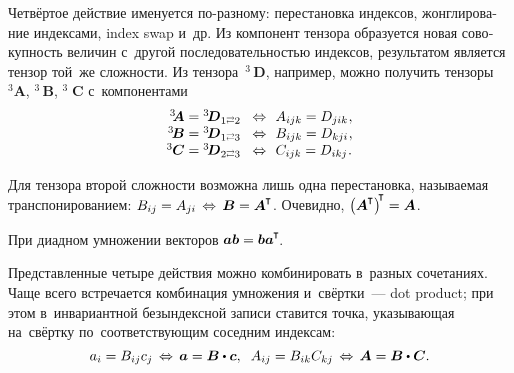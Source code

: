 \begin{otherlanguage}{russian}
Четвёртое действие именуется по\hbox{-}разному: перестановка индексов, жонглирование индексами, index swap и~др. Из компонент тензора образуется новая совокупность величин с~другой последовательностью индексов, результатом является тензор той~же сложности. Из тензора~${^3\!\!\,\bm{D}}$, например, можно получить тензоры ${^3\!\!\bm{A}}$, ${^3\!\!\,\bm{B}}$, ${^3\!\!\;\bm{C}}$ с~компонентами
\vspace{0.08em}\begin{equation}\label{action:4}
\begin{array}{rcl}
{^3\hspace{-0.25em}\bm{A}} = {^3\hspace{-0.16em}\bm{D}}_{1 \scalebox{0.6}[0.8]{$\rightleftarrows$} 2} & \!\Leftrightarrow\!\! &
A_{ijk} = D_{jik} \hspace{0.1ex},\\
{^3\hspace{-0.16em}\bm{B}} = {^3\hspace{-0.16em}\bm{D}}_{1 \scalebox{0.6}[0.8]{$\rightleftarrows$} 3} & \!\Leftrightarrow\!\! & B_{ijk} = D_{kji} \hspace{0.1ex},\\
{^3\hspace{-0.04em}\bm{C}} = {^3\hspace{-0.16em}\bm{D}}_{2 \scalebox{0.6}[0.8]{$\rightleftarrows$} 3} & \!\Leftrightarrow\!\! & C_{ijk} = D_{ikj} \hspace{0.1ex}.
\end{array}
\end{equation}

Для тензора второй сложности возможна лишь одна перестановка, называемая транспонированием: ${B_{ij} = A_{ji} \,\Leftrightarrow\, \bm{B} = \bm{A}^{\hspace{-0.05em}\T}}$\!. Очевидно, ${\left( \bm{A}^{\hspace{-0.05em}\T} \right)^{\hspace{-0.4ex}\T} = \bm{A}}$.

При диадном умножении векторов ${\bm{a} \bm{b} = \bm{b} \bm{a} ^{\hspace{-0.05em}\T}\!}$.

Представленные четыре действия можно комбинировать в~разных сочетаниях. Чаще всего встречается комбинация умножения и~свёртки~--- dot product; при этом в~инвариантной безындексной записи ставится точка, указывающая на~свёртку по~соответствующим соседним индексам:
\begin{equation}
a_i = B_{ij} c_j \,\Leftrightarrow\, \bm{a} = \bm{B} \dotp \bm{c}, \;\;
A_{ij} = B_{ik} C_{kj} \,\Leftrightarrow\, \bm{A} = \bm{B} \dotp \bm{C}.
\end{equation}


\end{otherlanguage}
